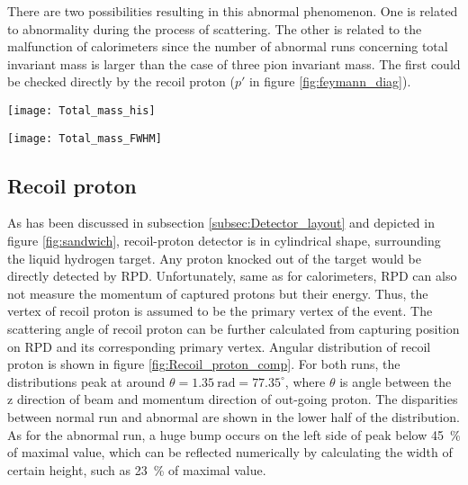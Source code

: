 There are two possibilities resulting in this abnormal phenomenon. One is related to abnormality during the process of scattering. The other is related to the malfunction of calorimeters since the number of abnormal runs concerning total invariant mass is larger than the case of three pion invariant mass. The first could be checked directly by the recoil proton ($p'$ in figure \ref{fig:feymann_diag}).

\begin{figure*}[!ht]
	\centering
	\vspace{2cm}
	\texttt{[image: Total\_mass\_his]}
	\caption{Histogram of invariant total mass distribution. The colors inside the histogram represent number of events corresponding to the run number and invariant mass. To better compare and conceive the structure of distribution between runs visually, the maximal value of each distribution is normalized to 1000. In the red dashed rectangles, it can be seen that the red strokes are much longer than the normal runs.}
	\label{fig:Total_mass_his}
	\vspace{2 cm}
	
	\texttt{[image: Total\_mass\_FWHM]}
	\caption{Value of full width at half maximum of total invariant distribution for each run. Typical value of FWHM for normal run is around \SI{1.5}{\giga\electronvolt}.There are several outliners that have much bigger FWHM value than the general one. Also there is a range of runs 70223 $\sim$ 70240 that have slight smaller value of FWHM. }
	\label{fig:Total_mass_FWHM}
	\vspace{3cm}
\end{figure*}

\subsection{Recoil proton}
\label{subsec:recoil_proton}
As has been discussed in subsection \ref{subsec:Detector_layout} and depicted in figure \ref{fig:sandwich}, recoil-proton detector is in cylindrical shape, surrounding the liquid hydrogen target. Any proton knocked out of the target would be directly detected by RPD. Unfortunately, same as for calorimeters, RPD can also not measure the momentum of captured protons but their energy. Thus, the vertex of recoil proton is assumed to be the primary vertex of the event. The scattering angle of recoil proton can be further calculated from capturing position on RPD and its corresponding primary vertex. Angular distribution of recoil proton is shown in figure \ref{fig:Recoil_proton_comp}. For both runs, the distributions peak at around $\theta=\SI{1.35}{\radian} = 77.35^{\circ}$, where $\theta$ is angle between the z direction of beam and momentum direction of out-going proton. The disparities between normal run and abnormal are shown in the lower half of the distribution. As for the abnormal run, a huge bump occurs on the left side of peak below \SI{45}{\percent} of maximal value, which can be reflected numerically by calculating the width of certain height, such as \SI{23}{\percent} of maximal value.

